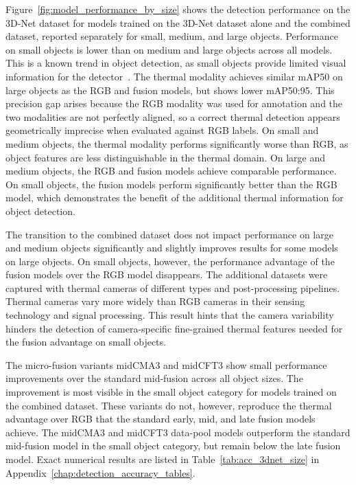 \documentclass[12pt,oneside,bibtotoc,liststotoc]{scrbook}
\begin{document}
Figure~\ref{fig:model_performance_by_size} shows the detection performance on the 3D-Net dataset
for models trained on the 3D-Net dataset alone and the combined dataset, reported separately
for small, medium, and large objects. Performance on small objects is lower than on medium
and large objects across all models. This is a known trend in object detection, as small
objects provide limited visual information for the
detector~\cite{kisantal2019augmentationSmallObjectDetection, chen2020fourPillarsSmallObjectDetectionSurvey}.
The thermal modality achieves similar mAP50 on large objects as the RGB and fusion models,
but shows lower mAP50:95. This precision gap arises because the RGB modality was used
for annotation and the two modalities are not perfectly aligned, so a correct thermal
detection appears geometrically imprecise when evaluated against RGB labels.
On small and medium objects, the thermal modality performs significantly worse than RGB,
as object features are less distinguishable in the thermal domain. On large and medium
objects, the RGB and fusion models achieve comparable performance. On small objects, the
fusion models perform significantly better than the RGB model, which demonstrates the
benefit of the additional thermal information for object detection.

The transition to the combined dataset does not impact performance on large and medium
objects significantly and slightly improves results for some models on large objects.
On small objects, however, the performance advantage of the fusion models over the RGB
model disappears. The additional datasets were captured with
thermal cameras of different types and post-processing pipelines. Thermal cameras vary
more widely than RGB cameras in their sensing technology and signal processing. This
result hints that the
camera variability hinders the detection of camera-specific fine-grained thermal
features needed for the fusion advantage on small objects.

The micro-fusion variants midCMA3 and midCFT3 show small performance improvements over
the standard mid-fusion across all object sizes. The improvement is most visible in the
small object category for models trained on the combined dataset. These variants do not,
however, reproduce the thermal advantage over RGB that the standard early, mid, and late
fusion models achieve. The midCMA3 and midCFT3 data-pool models outperform the standard
mid-fusion model in the small object category, but remain below the late fusion model.
Exact numerical results are listed in Table~\ref{tab:acc_3dnet_size}
in Appendix~\ref{chap:detection_accuracy_tables}.
\end{document}
